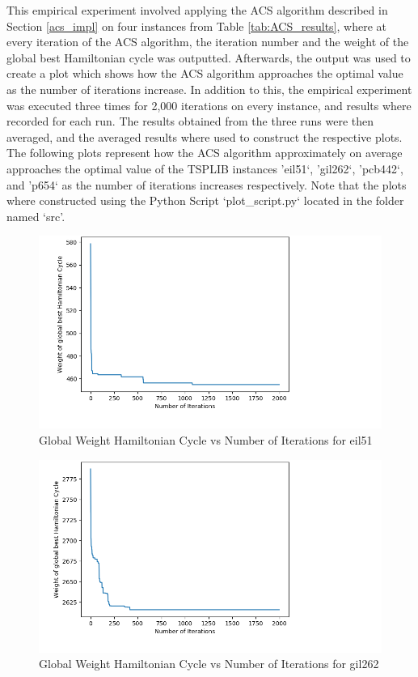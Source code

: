 \documentclass[12pt]{article}
\numberwithin{equation}{subsection}
\numberwithin{table}{subsection}
\numberwithin{algorithm}{subsection}
\numberwithin{figure}{subsection}
\begin{document}
This empirical experiment involved applying the ACS algorithm described in Section \ref{acs_impl} on four instances from Table \ref{tab:ACS_results}, where at every iteration of the ACS algorithm, the iteration number and the weight of the global best Hamiltonian cycle was outputted. Afterwards, the output was used to create a plot which shows how the ACS algorithm approaches the optimal value as the number of iterations increase. In addition to this, the empirical experiment was executed three times for 2,000 iterations on every instance, and results where recorded for each run. The results obtained from the three runs were then averaged, and the averaged results where used to construct the respective plots. The following plots represent how the ACS algorithm approximately on average approaches the optimal value of the TSPLIB instances 'eil51`, 'gil262`, 'pcb442`, and 'p654` as the number of iterations increases respectively. Note that the plots where constructed using the Python Script `plot\_script.py` located in the folder named `src'.
\begin{figure}[H]
  \centering
  \caption{Global Weight Hamiltonian Cycle vs Number of Iterations for eil51}
  \label{plot1}
  \includegraphics[scale =0.8]{screenshots/screenshot2.png}
\end{figure}
\begin{figure}[H]
   \centering
   \caption{Global Weight Hamiltonian Cycle vs Number of Iterations for gil262}
  \label{plot2}
  \includegraphics[scale=0.8]{screenshots/screenshot3.png}
\end{figure}
\end{document}
